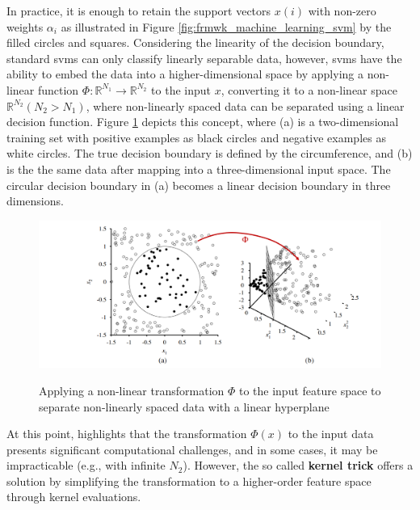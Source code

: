 
In practice, it is enough to retain the support vectors $x(i)$ with non-zero weights $\alpha_i$ as illustrated in Figure \ref{fig:frmwk_machine_learning_svm} by the filled circles and squares. Considering the linearity of the decision boundary, standard \gls{svm}s can only classify linearly separable data, however, \gls{svm}s have the ability to embed the data into a higher-dimensional space by applying a non-linear function $\Phi: \mathbb{R}^{N_1} \rightarrow \mathbb{R}^{N_2}$ to the input $x$, converting it to a non-linear space $\mathbb{R}^{N_2} (N_2 > N_1)$, where non-linearly spaced data can be separated using a linear decision function. Figure \ref{fig:frmwk_machine_learning_svm_kernel_trick} depicts this concept, where (a) is a two-dimensional training set with positive examples as black circles and negative examples as white circles. The true decision boundary is defined by the circumference, and (b) is the the same data after mapping into a three-dimensional input space. The circular decision boundary in (a) becomes a linear decision boundary in three dimensions.

\begin{figure}[htbp]
    \raggedright
        \caption{Applying a non-linear transformation $\Phi$ to the input feature space to separate non-linearly spaced data with a linear hyperplane}
        \includegraphics[width=1\textwidth]{resources/images/030-theoretical_framework/Framework_machine_learning_SVM_kernel_trick.png}
        \label{fig:frmwk_machine_learning_svm_kernel_trick}
\end{figure}

At this point, \textcite{Russel2010} highlights that the transformation $\Phi(x)$ to the input data presents significant computational challenges, and in some cases, it may be impracticable (e.g., with infinite $N_2$). However, the so called \textbf{kernel trick} offers a solution by simplifying the transformation to a higher-order feature space through kernel evaluations. %

